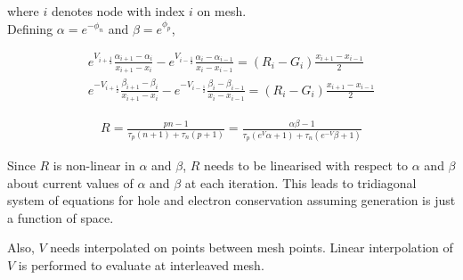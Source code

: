 where $i$ denotes node with index $i$ on mesh.\\

Defining $\alpha = e^{-\phi_n}$ and $\beta = e^{\phi_p}$,

\begin{align*}
e^{V_{i+\frac{1}{2}}} \frac{\alpha_{i+1}-\alpha_i}{{x_{i+1}-x_{i}}} - e^{V_{i-\frac{1}{2}}} \frac{\alpha_{i}-{\alpha_{i-1}}}{x_i-x_{i-1}} = (R_i - G_i)\frac{x_{i+1}-x_{i-1}}{2}\\
e^{-V_{i+\frac{1}{2}}} \frac{\beta_{i+1}-\beta_i}{x_{i+1}-x_{i}} - e^{-V_{i-\frac{1}{2}}} \frac{\beta_{i}-\beta_{i-1}}{x_i-x_{i-1}} = (R_i - G_i)\frac{x_{i+1}-x_{i-1}}{2}
\tag{2.20} \label{eq:35}
\end{align*}  

\begin{align*}
R = \frac{pn-1}{\tau_p(n+1) + \tau_n(p+1)} = \frac{\alpha\beta-1}{\tau_p(e^{V}\alpha+1) + \tau_n(e^{-V}\beta+1)}
\tag{2.21} \label{eq:39}
\end{align*}        

Since $R$ is non-linear in $\alpha$ and $\beta$, $R$ needs to be linearised with respect to $\alpha$ and $\beta$ about current values of $\alpha$ and $\beta$ at each iteration. This leads to tridiagonal system of equations for hole and electron conservation assuming generation is just a function of space.

Also, $V$ needs interpolated on points between mesh points. Linear interpolation of $V$ is performed to evaluate at interleaved mesh.
